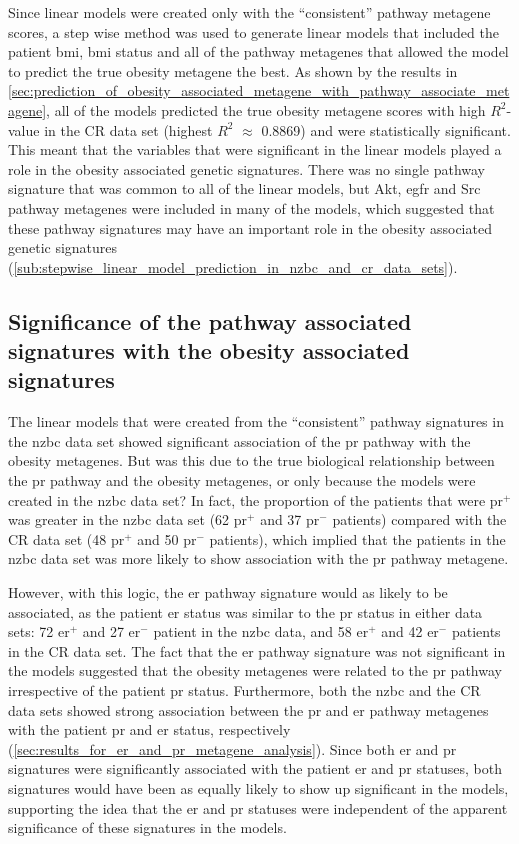 Since linear models were created only with the ``consistent'' pathway metagene scores, a step wise method was used to generate linear models that included the patient \gls{bmi}, \gls{bmi} status and all of the pathway metagenes that allowed the model to predict the true obesity metagene the best.
As shown by the results in \cref{sec:prediction_of_obesity_associated_metagene_with_pathway_associate_metagene}, all of the models predicted the true obesity metagene scores with high $R^2$-value in the CR data set (highest $R^2$ $\approx$ 0.8869) and were statistically significant.
This meant that the variables that were significant in the linear models played a role in the obesity associated genetic signatures.
There was no single pathway signature that was common to all of the linear models, but Akt, \gls{egfr} and Src pathway metagenes were included in many of the models, which suggested that these pathway signatures may have an important role in the obesity associated genetic signatures (\cref{sub:stepwise_linear_model_prediction_in_nzbc_and_cr_data_sets}).

\subsection{Significance of the pathway associated signatures with the obesity associated signatures}
\label{sub:significance_of_pr_pathway}

The linear models that were created from the ``consistent'' pathway signatures in the \gls{nzbc} data set showed significant association of the \gls{pr} pathway with the obesity metagenes.
But was this due to the true biological relationship between the \gls{pr} pathway and the obesity metagenes, or only because the models were created in the \gls{nzbc} data set?
In fact, the proportion of the patients that were \gls{pr}$^+$ was greater in the \gls{nzbc} data set (62 \gls{pr}$^+$ and 37 \gls{pr}$^-$ patients) compared with the CR data set (48 \gls{pr}$^+$ and 50 \gls{pr}$^-$ patients), which implied that the patients in the \gls{nzbc} data set was more likely to show association with the \gls{pr} pathway metagene.

However, with this logic, the \gls{er} pathway signature would as likely to be associated, as the   patient \gls{er} status was similar to the \gls{pr} status in either data sets: 72 \gls{er}$^+$ and 27 \gls{er}$^-$ patient in the \gls{nzbc} data, and 58 \gls{er}$^+$ and  42 \gls{er}$^-$ patients in the  CR data set.
The fact that the \gls{er} pathway signature was not significant in the models suggested that the obesity metagenes were related to the \gls{pr} pathway irrespective of the patient \gls{pr} status.
Furthermore, both the \gls{nzbc} and the CR data sets showed strong association between the \gls{pr} and \gls{er} pathway metagenes with the patient \gls{pr} and \gls{er} status, respectively (\cref{sec:results_for_er_and_pr_metagene_analysis}).
Since both \gls{er} and \gls{pr} signatures were significantly associated with the patient \gls{er} and \gls{pr} statuses, both signatures would have been as equally likely to show up significant in the models, supporting the idea that the \gls{er} and \gls{pr} statuses were independent of the apparent significance of these signatures in the models.

